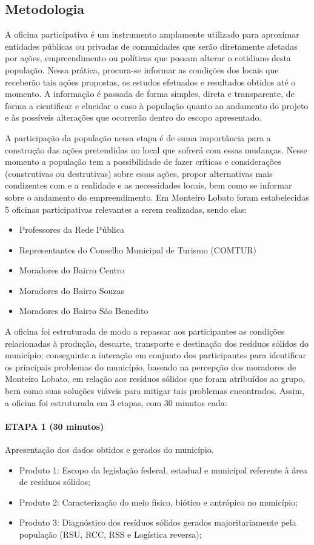 
	\subsection{Metodologia}
	A oficina participativa é um instrumento amplamente utilizado para aproximar entidades públicas ou privadas de comunidades que serão diretamente afetadas por ações, empreendimento ou políticas que possam alterar o cotidiano desta população. Nessa prática, procura-se informar as condições dos locais que receberão tais ações propostas, os estudos efetuados e resultados obtidos até o momento. A informação é passada de forma simples, direta e transparente, de forma a cientificar e elucidar o caso à população quanto ao andamento do projeto e às possíveis alterações que ocorrerão dentro do escopo apresentado. 
	
	A participação da população nessa etapa é de suma importância para a construção das ações pretendidas no local que sofrerá com essas mudanças. Nesse momento a população tem a possibilidade de fazer críticas e considerações (construtivas ou destrutivas) sobre essas ações, propor alternativas mais condizentes com e a realidade e as necessidades locais, bem como se informar sobre o andamento do empreendimento.
	Em Monteiro Lobato foram estabelecidas 5 oficinas participativas relevantes a serem realizadas, sendo elas:
	
	\begin{itemize}
		\item Professores da Rede Pública
		\item Representantes do Conselho Municipal de Turismo (COMTUR)
		\item Moradores do Bairro Centro
		\item Moradores do Bairro Souzas
		\item Moradores do Bairro São Benedito
	\end{itemize}
	
	A oficina foi estruturada de modo a repassar aos participantes as condições relacionadas à produção, descarte, transporte e destinação dos resíduos sólidos do município; conseguinte a interação em conjunto dos participantes para identificar os principais problemas do município, baseado na percepção dos moradores de Monteiro Lobato, em relação aos resíduos sólidos que foram atribuídos ao grupo, bem como suas soluções viáveis para mitigar tais problemas encontrados. Assim, a oficina foi estruturada em 3 etapas, com 30 minutos cada: 
	
	
	\paragraph{ETAPA 1 (30 minutos)} Apresentação dos dados obtidos e gerados do município.
	\begin{itemize}
		\item Produto 1: Escopo da legislação federal, estadual e municipal referente à área de resíduos sólidos;
		\item Produto 2: Caracterização do meio físico, biótico e antrópico no município;
		\item Produto 3: Diagnóstico dos resíduos sólidos gerados majoritariamente pela população (RSU, RCC, RSS e Logística reversa);
	\end{itemize}
	 
